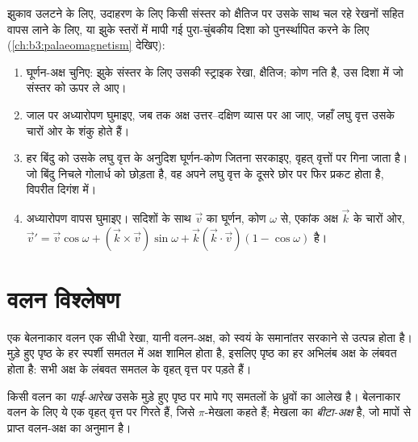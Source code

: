 \begin{method}[आँकड़े को एक अक्ष के चारों ओर घुमाना]\label{met:b3:structural-analysis:rotation}
झुकाव उलटने के लिए, उदाहरण के लिए किसी संस्तर को क्षैतिज पर उसके साथ चल रहे
रेखनों सहित वापस लाने के लिए, या झुके स्तरों में मापी गई पुरा-चुंबकीय दिशा
को पुनर्स्थापित करने के लिए (\cref{ch:b3:palaeomagnetism} देखिए):
  \begin{enumerate}
  \item घूर्णन-अक्ष चुनिए: झुके संस्तर के लिए उसकी स्ट्राइक रेखा,
        क्षैतिज; कोण नति है, उस दिशा में जो संस्तर को ऊपर ले आए।
  \item जाल पर अध्यारोपण घुमाइए, जब तक अक्ष
        उत्तर--दक्षिण व्यास पर आ जाए, जहाँ लघु वृत्त
        उसके चारों ओर के शंकु होते हैं।
  \item हर बिंदु को उसके लघु वृत्त के अनुदिश घूर्णन-कोण जितना सरकाइए,
        वृहत् वृत्तों पर गिना जाता है। जो बिंदु निचले गोलार्ध को छोड़ता है,
        वह अपने लघु वृत्त के दूसरे छोर पर फिर प्रकट होता है,
        विपरीत दिगंश में।
  \item अध्यारोपण वापस घुमाइए। सदिशों के साथ $\vec v$ का घूर्णन, कोण
        $\omega$ से, एकांक अक्ष $\vec k$ के चारों ओर, $\vec v' = \vec v
        \cos\omega + (\vec k\times\vec v)\sin\omega + \vec k(\vec k\cdot\vec
        v)(1 - \cos\omega)$ है।
\end{enumerate}
\end{method}

\section{वलन विश्लेषण}\label{sec:b3:structural-analysis:folds}

एक बेलनाकार वलन एक सीधी रेखा, यानी वलन-अक्ष, को स्वयं के समानांतर सरकाने से उत्पन्न होता है।
मुड़े हुए पृष्ठ के हर स्पर्शी समतल में अक्ष शामिल होता है, इसलिए पृष्ठ का हर
अभिलंब अक्ष के लंबवत होता है: सभी  अक्ष के लंबवत समतल के वृहत् वृत्त
पर पड़ते हैं।

\begin{definition}[पाई-आरेख, बीटा-अक्ष]\label{def:b3:structural-analysis:pi}
किसी वलन का \emph{पाई-आरेख} उसके मुड़े हुए पृष्ठ पर मापे गए
समतलों के ध्रुवों का आलेख है। बेलनाकार वलन के लिए ये एक वृहत् वृत्त पर गिरते हैं,
जिसे $\pi$-मेखला कहते हैं; मेखला का 
\emph{बीटा-अक्ष} है, जो मापों से प्राप्त
वलन-अक्ष का अनुमान है।
\end{definition}

